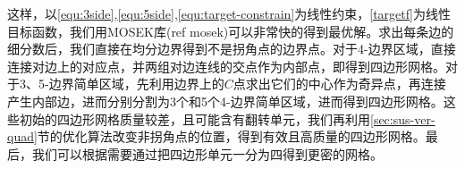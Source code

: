 这样，以\ref{equ:3side},\ref{equ:5side},\ref{equ:target-constrain}为线性约束，\ref{targetf}为线性目标函数，我们用MOSEK库(ref mosek)可以非常快的得到最优解。求出每条边的细分数后，我们直接在均分边界得到不是拐角点的边界点。对于4-边界区域，直接连接对边上的对应点，并两组对边连线的交点作为内部点，即得到四边形网格。对于3、5-边界简单区域，先利用边界上的$C$点求出它们的中心作为奇异点，再连接产生内部边，进而分别分割为3个和5个4-边界简单区域，进而得到四边形网格。这些初始的四边形网格质量较差，且可能含有翻转单元，我们再利用\ref{sec:sus-ver-quad}节的优化算法改变非拐角点的位置，得到有效且高质量的四边形网格。最后，我们可以根据需要通过把四边形单元一分为四得到更密的网格。
